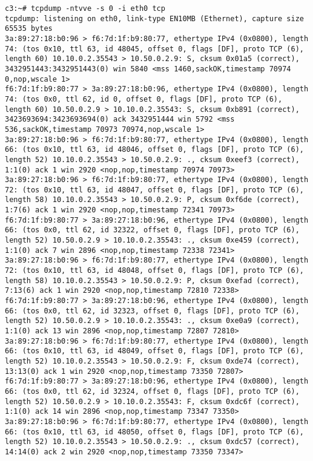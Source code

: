 \documentclass[a4paper,12pt]{article}
\begin{document}
\begin{Verbatim}
c3:~# tcpdump -ntvve -s 0 -i eth0 tcp
tcpdump: listening on eth0, link-type EN10MB (Ethernet), capture size 65535 bytes
3a:89:27:18:b0:96 > f6:7d:1f:b9:80:77, ethertype IPv4 (0x0800), length 74: (tos 0x10, ttl 63, id 48045, offset 0, flags [DF], proto TCP (6), length 60) 10.10.0.2.35543 > 10.50.0.2.9: S, cksum 0x01a5 (correct), 3432951443:3432951443(0) win 5840 <mss 1460,sackOK,timestamp 70974 0,nop,wscale 1>
f6:7d:1f:b9:80:77 > 3a:89:27:18:b0:96, ethertype IPv4 (0x0800), length 74: (tos 0x0, ttl 62, id 0, offset 0, flags [DF], proto TCP (6), length 60) 10.50.0.2.9 > 10.10.0.2.35543: S, cksum 0xb891 (correct), 3423693694:3423693694(0) ack 3432951444 win 5792 <mss 536,sackOK,timestamp 70973 70974,nop,wscale 1>
3a:89:27:18:b0:96 > f6:7d:1f:b9:80:77, ethertype IPv4 (0x0800), length 66: (tos 0x10, ttl 63, id 48046, offset 0, flags [DF], proto TCP (6), length 52) 10.10.0.2.35543 > 10.50.0.2.9: ., cksum 0xeef3 (correct), 1:1(0) ack 1 win 2920 <nop,nop,timestamp 70974 70973>
3a:89:27:18:b0:96 > f6:7d:1f:b9:80:77, ethertype IPv4 (0x0800), length 72: (tos 0x10, ttl 63, id 48047, offset 0, flags [DF], proto TCP (6), length 58) 10.10.0.2.35543 > 10.50.0.2.9: P, cksum 0xf6de (correct), 1:7(6) ack 1 win 2920 <nop,nop,timestamp 72341 70973>
f6:7d:1f:b9:80:77 > 3a:89:27:18:b0:96, ethertype IPv4 (0x0800), length 66: (tos 0x0, ttl 62, id 32322, offset 0, flags [DF], proto TCP (6), length 52) 10.50.0.2.9 > 10.10.0.2.35543: ., cksum 0xe459 (correct), 1:1(0) ack 7 win 2896 <nop,nop,timestamp 72338 72341>
3a:89:27:18:b0:96 > f6:7d:1f:b9:80:77, ethertype IPv4 (0x0800), length 72: (tos 0x10, ttl 63, id 48048, offset 0, flags [DF], proto TCP (6), length 58) 10.10.0.2.35543 > 10.50.0.2.9: P, cksum 0xefad (correct), 7:13(6) ack 1 win 2920 <nop,nop,timestamp 72810 72338>
f6:7d:1f:b9:80:77 > 3a:89:27:18:b0:96, ethertype IPv4 (0x0800), length 66: (tos 0x0, ttl 62, id 32323, offset 0, flags [DF], proto TCP (6), length 52) 10.50.0.2.9 > 10.10.0.2.35543: ., cksum 0xe0a9 (correct), 1:1(0) ack 13 win 2896 <nop,nop,timestamp 72807 72810>
3a:89:27:18:b0:96 > f6:7d:1f:b9:80:77, ethertype IPv4 (0x0800), length 66: (tos 0x10, ttl 63, id 48049, offset 0, flags [DF], proto TCP (6), length 52) 10.10.0.2.35543 > 10.50.0.2.9: F, cksum 0xde74 (correct), 13:13(0) ack 1 win 2920 <nop,nop,timestamp 73350 72807>
f6:7d:1f:b9:80:77 > 3a:89:27:18:b0:96, ethertype IPv4 (0x0800), length 66: (tos 0x0, ttl 62, id 32324, offset 0, flags [DF], proto TCP (6), length 52) 10.50.0.2.9 > 10.10.0.2.35543: F, cksum 0xdc6f (correct), 1:1(0) ack 14 win 2896 <nop,nop,timestamp 73347 73350>
3a:89:27:18:b0:96 > f6:7d:1f:b9:80:77, ethertype IPv4 (0x0800), length 66: (tos 0x10, ttl 63, id 48050, offset 0, flags [DF], proto TCP (6), length 52) 10.10.0.2.35543 > 10.50.0.2.9: ., cksum 0xdc57 (correct), 14:14(0) ack 2 win 2920 <nop,nop,timestamp 73350 73347>
\end{Verbatim}
\end{document}
